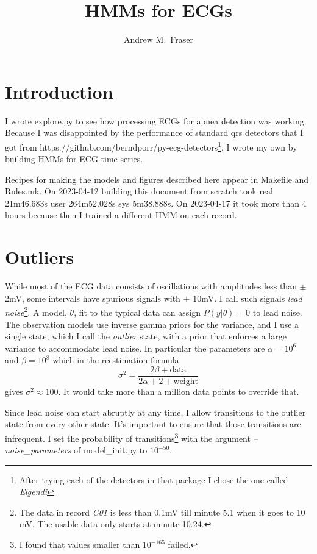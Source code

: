 \documentclass[12pt]{article}
\title{HMMs for ECGs}
\author{Andrew M.\ Fraser}
\begin{document}
\maketitle

\section{Introduction}
\label{sec:introduction}

I wrote explore.py to see how processing ECGs for apnea detection was
working.  Because I was disappointed by the performance of standard qrs
detectors that I got from
https://github.com/berndporr/py-ecg-detectors\footnote{After trying
  each of the detectors in that package I chose the one called
  \emph{Elgendi} }, I wrote my own by
building HMMs for ECG time series.

Recipes for making the models and figures described here appear in
Makefile and Rules.mk.  On 2023-04-12 building this document from
scratch took real 21m46.683s user 264m52.028s sys 5m38.888s.  On
2023-04-17 it took more than 4 hours because then I trained a
different HMM on each record.

\section{Outliers}
\label{sec:outliers}

While most of the ECG data consists of oscillations with amplitudes
less than $\pm$ 2mV, some intervals have spurious signals with $\pm$
10mV.  I call such signals \emph{lead noise}\footnote{The data in
  record \emph{C01} is less than 0.1mV till minute 5.1 when it goes to
  10 mV.  The usable data only starts at minute 10.24.}.  A model,
$\theta$, fit to the typical data can assign $P(y|\theta) = 0$ to lead
noise.  The observation models use inverse gamma priors for the
variance, and I use a single state, which I call the \emph{outlier}
state, with a prior that enforces a large variance to accommodate lead
noise.  In particular the parameters are $\alpha=10^{6}$ and
$\beta=10^{8}$ which in the reestimation formula
\begin{equation*}
  \sigma^2 = \frac{2 \beta + \text{data}}{2 \alpha +2 + \text{weight}}
\end{equation*}
gives $\sigma^2 \approx 100$.  It would take more than a million data
points to override that.

Since lead noise can start abruptly at any time, I allow transitions
to the outlier state from every other state.  It's important to ensure
that those transitions are infrequent.  I set the probability of
transitions\footnote{I found that values smaller than $10^{-165}$
  failed.} with the argument \emph{--noise\_parameters} of
model\_init.py to $10^{-50}$.
\end{document}
